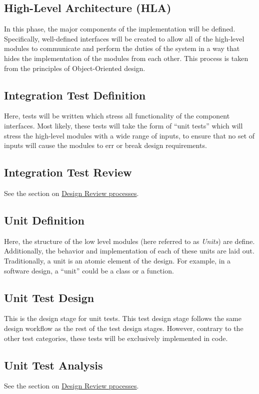 \documentclass[12pt]{article}
\begin{document}
\subsection{High-Level Architecture (HLA)}
In this phase, the major components of the implementation will be defined.
Specifically, well-defined interfaces will be created to allow all of the
high-level modules to communicate and perform the duties of the system in a
way that hides the implementation of the modules from each other. This
process is taken from the principles of Object-Oriented design.

\subsection{Integration Test Definition}
Here, tests will be written which stress all functionality of the component
interfaces. Most likely, these tests will take the form of ``unit tests'' which
will stress the high-level modules with a wide range of inputs, to ensure that
no set of inputs will cause the modules to err or break design requirements.

\subsection{Integration Test Review}
See the section on \hyperref[sec:review]{Design Review processes}.

\subsection{Unit Definition}
Here, the structure of the low level modules (here referred to as {\it Units})
are define. Additionally, the behavior and implementation of each of these
units are laid out. Traditionally, a unit is an atomic element of the design.
For example, in a software design, a ``unit'' could be a class or a function.

\subsection{Unit Test Design}
This is the design stage for unit tests. This test design stage follows the
same design workflow as the rest of the test design stages. However, contrary
to the other test categories, these tests will be exclusively implemented in
code.

\subsection{Unit Test Analysis}
See the section on \hyperref[sec:review]{Design Review processes}.
\end{document}
